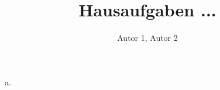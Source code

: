\documentclass[11pt]{article}
\title{Hausaufgaben ...} %
\author{Autor 1, Autor 2}
\begin{document}
\maketitle
\clearpage
\tableofcontents
\clearpage

\pagestyle{fancy}
\fancyhf{}
\rhead{\today}

\section{}

		\subsection{}
			\begin{enumerate}[(a)]
				\item 
			\end{enumerate}
\end{document}
